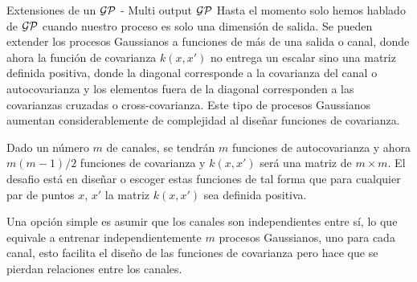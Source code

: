 \documentclass[9pt]{beamer}
\begin{document}
\begin{frame}{Extensiones de un $\mathcal{GP}$ - Multi output $\mathcal{GP}$}
    Hasta el momento solo hemos hablado de $\mathcal{GP}$ cuando nuestro proceso es solo una dimensión de salida. Se pueden extender los procesos Gaussianos a funciones de más de una salida o canal, donde ahora la función de covarianza $k(x, x')$ no entrega un escalar sino una matriz definida positiva, donde la diagonal corresponde a la covarianza del canal o autocovarianza y los elementos fuera de la diagonal corresponden a las covarianzas cruzadas o cross-covarianza. Este tipo de procesos Gaussianos aumentan considerablemente de complejidad al diseñar funciones de covarianza.

    \vspace{0.2cm} \pause

    Dado un número $m$ de canales, se tendrán $m$ funciones de autocovarianza y ahora $m(m-1)/2$ funciones de covarianza y $k(x, x')$ será una matriz de $m\times m$. El desafio está en diseñar o escoger estas funciones de tal forma que para cualquier par de puntos $x$, $x'$ la matriz $k(x, x')$ sea definida positiva.

    \vspace{0.2cm} \pause

    Una opción simple es asumir que los canales son independientes entre sí, lo que equivale a entrenar independientemente $m$ procesos Gaussianos, uno para cada canal, esto facilita el diseño de las funciones de covarianza pero hace que se pierdan relaciones entre los canales.
 



    
\end{frame}




\begin{frame}
  \titlepage
\end{frame}




%
\end{document}
